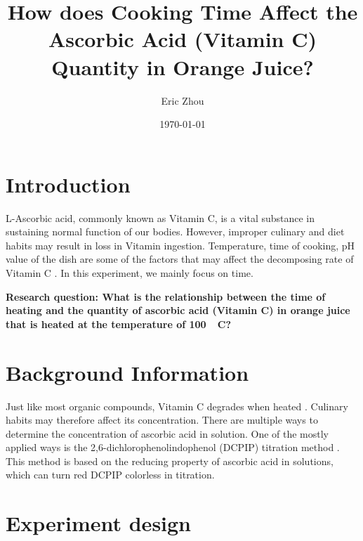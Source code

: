 \documentclass[a4paper]{article}
\begin{document}
\begin{titlepage}
    \title{\textbf{How does Cooking Time Affect the Ascorbic Acid (Vitamin C) Quantity in Orange Juice?} }
    \author{Eric Zhou}
    \date{\today}
    \maketitle
\end{titlepage}


\section{Introduction}

L-Ascorbic acid, commonly known as Vitamin C, is a vital substance in sustaining normal function of our bodies. However, improper culinary and diet habits may result in loss in Vitamin ingestion. Temperature, time of cooking, pH value of the dish are some of the factors that may affect the decomposing rate of Vitamin C \cite{VCDecomp}. In this experiment, we mainly focus on time.

\textbf{Research question: What is the relationship between the time of heating and the quantity of ascorbic acid (Vitamin C) in orange juice that is heated at the temperature of \SI{100}{{}^\circ C}?}

\section{Background Information}

Just like most organic compounds, Vitamin C degrades when heated \cite{CRUZ2008483}. Culinary habits may therefore affect its concentration. There are multiple ways to determine the concentration of ascorbic acid in solution. One of the mostly applied ways is the 2,6-dichlorophenolindophenol (DCPIP) titration method \cite{DAVIES1991225,vahid2012titrimetric}. This method is based on the reducing property of ascorbic acid in solutions, which can turn red DCPIP colorless in titration. 

\section{Experiment design}
\end{document}
